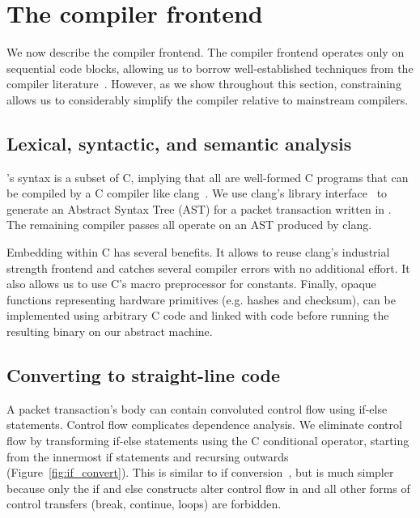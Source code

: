 \section{The \pktlanguage compiler frontend}

We now describe the \pktlanguage compiler frontend. The compiler frontend
operates only on sequential code blocks, allowing us to borrow well-established
techniques from the compiler literature~\cite{muchnik}. However, as we show
throughout this section, constraining \pktlanguage allows us to considerably
simplify the compiler relative to mainstream compilers.

\subsection{Lexical, syntactic, and semantic analysis}
\pktlanguage's syntax is a subset of C, implying that all \pktlanguage are
well-formed C programs that can be compiled by a C compiler like
clang~\cite{clang}. We use clang's library interface~\cite{libclang} to
generate an Abstract Syntax Tree (AST) for a packet transaction written in
\pktlanguage. The remaining compiler passes all operate on an AST produced by
clang.

Embedding \pktlanguage within C has several benefits. It allows to reuse
clang's industrial strength frontend and catches several compiler errors with
no additional effort.  It also allows us to use C's macro preprocessor for
constants. Finally, opaque functions representing hardware primitives (e.g.
hashes and checksum), can be implemented using arbitrary C code and linked with
\pktlanguage code before running the resulting binary on our abstract machine.

\subsection{Converting to straight-line code}
A packet transaction's body can contain convoluted control flow using if-else
statements. Control flow complicates dependence analysis. We eliminate control
flow by transforming if-else statements using the C conditional operator,
starting from the innermost if statements and recursing outwards
(Figure~\ref{fig:if_convert}). This is similar to if
conversion~\cite{allen_if_conversion}, but is much simpler because only the if
and else constructs alter control flow in \pktlanguage and all other forms of
control transfers (break, continue, loops) are forbidden.

